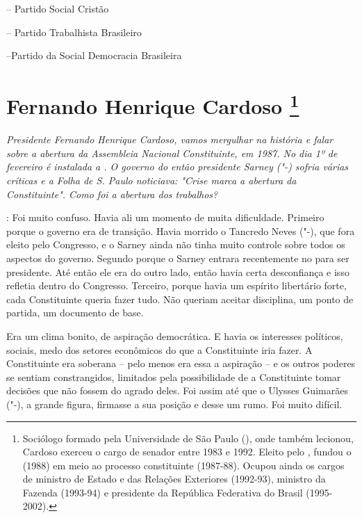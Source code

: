  -- Partido Social Cristão

 -- Partido Trabalhista Brasileiro

 --Partido da Social Democracia Brasileira


\chapter{Fernando Henrique Cardoso
\footnote{Sociólogo formado pela Universidade de São Paulo (), onde também
lecionou, Cardoso exerceu o cargo de senador entre 1983 e 1992. Eleito
pelo , fundou o  (1988) em meio ao processo constituinte
(1987-88). Ocupou ainda os cargos de ministro de Estado e das Relações
Exteriores (1992-93), ministro da Fazenda (1993-94) e presidente da
República Federativa do Brasil (1995-2002).}}

\emph{ Presidente Fernando Henrique Cardoso, vamos mergulhar na
história e falar sobre a abertura da Assembleia Nacional Constituinte,
em 1987. No dia 1º de fevereiro é instalada a . O governo do então
presidente Sarney ("-) sofria várias críticas e a Folha de S. Paulo
noticiava: "Crise marca a abertura da Constituinte". Como foi a abertura
dos trabalhos?}

\noindent{}: Foi muito confuso. Havia ali um
momento de muita dificuldade. Primeiro porque o governo era de
transição. Havia morrido o Tancredo Neves ("-), que fora eleito
pelo Congresso, e o Sarney ainda não tinha muito controle sobre todos os
aspectos do governo. Segundo porque o Sarney entrara recentemente no
 para ser presidente. Até então ele era do outro lado, então havia
certa desconfiança e isso refletia dentro do Congresso. Terceiro, porque
havia um espírito libertário forte, cada Constituinte queria fazer tudo.
Não queriam aceitar disciplina, um ponto de partida, um documento de
base.

Era um clima bonito, de aspiração democrática. E havia os interesses
políticos, sociais, medo dos setores econômicos do que a Constituinte
iria fazer. A Constituinte era soberana -- pelo menos era essa a
aspiração -- e os outros poderes se sentiam constrangidos, limitados
pela possibilidade de a Constituinte tomar decisões que não fossem do
agrado deles. Foi assim até que o Ulysses Guimarães ("-), a grande
figura, firmasse a sua posição e desse um rumo. Foi muito difícil.

